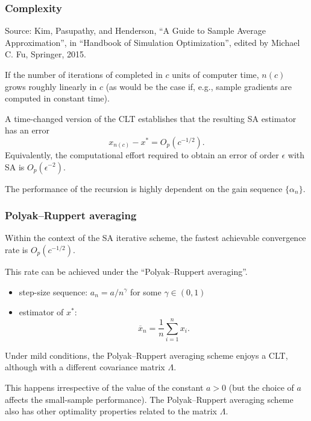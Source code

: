 \documentclass{beamer}
\begin{document}
\begin{frame}
\frametitle{Complexity}

Source: Kim, Pasupathy, and Henderson, ``A Guide to Sample Average Approximation'', in ``Handbook of Simulation Optimization'', edited by Michael C. Fu, Springer, 2015.

\mbox{}

If the number of iterations of completed in $c$ units of computer time, $n(c)$ grows roughly linearly in $c$
(as would be the case if, e.g., sample gradients are computed in constant time).

\mbox{}

A time-changed version of the CLT establishes that the resulting SA estimator has
an error
$$
x_{n(c)} - x^* = O_p(c^{-1/2}).
$$
Equivalently, the computational effort required to obtain an error of order $\epsilon$ with SA is $O_p(\epsilon^{-2})$.

\mbox{}

The performance of the recursion is highly dependent on the gain sequence $\{ \alpha_n \}$.

\end{frame}

\begin{frame}
\frametitle{Polyak–Ruppert averaging}

Within the context of the SA iterative scheme, the fastest achievable convergence rate is $O_p(c^{-1/2})$.

\mbox{}

This rate can be achieved under the ``Polyak–Ruppert averaging''.
\begin{itemize}
	\item 
step-size sequence: $a_n = a/{n^{\gamma}}$ for some $\gamma \in (0,1)$
\item
estimator of ${x}^*$:
$$
\overline{x}_n = \frac{1}{n} \sum_{i = 1}^n x_i.
$$
\end{itemize}

Under mild conditions, the Polyak–Ruppert averaging scheme enjoys a CLT, although with a different covariance matrix $\Lambda$.

\mbox{}

This happens irrespective of the value of the constant $a > 0$ (but the choice of $a$ affects the small-sample performance).
The Polyak–Ruppert averaging scheme also has other optimality properties related to
the matrix $\Lambda$.

\end{frame}
\end{document}
